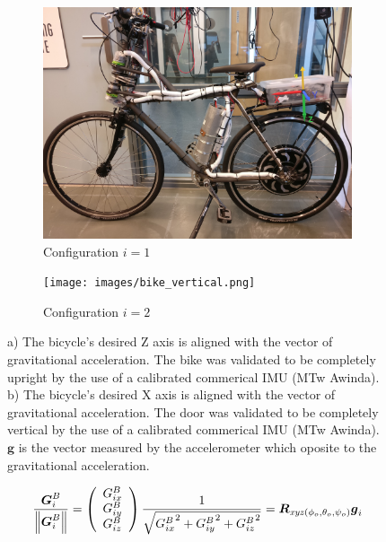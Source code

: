  \begin{figure}
    \centering
    \begin{subfigure}[htbb]{0.48\textwidth}
        \centering
        \includegraphics[width=\textwidth]{images/bike_upright.jpg}
        \caption{Configuration \ensuremath{i=1}}
        \label{fig:config1}
    \end{subfigure}
    \hfill
    \begin{subfigure}[htbb]{0.48\textwidth}
        \centering
        \texttt{[image: images/bike\_vertical.png]}
        \caption{Configuration \ensuremath{i=2}}
        \label{fig:config2}
    \end{subfigure}
    \caption{a) The bicycle's desired Z axis is aligned with the vector of gravitational acceleration. The bike was validated to be completely upright by the use of a calibrated commerical IMU (MTw Awinda). b) The bicycle's desired X axis is aligned with the vector of gravitational acceleration. The door was validated to be completely vertical by the use of a calibrated commerical IMU (MTw Awinda). \ensuremath{\mathbf{g}} is the vector measured by the accelerometer which oposite to the gravitational acceleration.}
 \end{figure}
 \begin{equation}
 \frac{\boldsymbol{G}_{i}^B}{\left\lVert\boldsymbol{G}_{i}^B\right\rVert}=\left(\begin{array}{l}{G_{i x}^B} \\ {G_{i y}^B} \\ {G_{i z}^B}\end{array}\right)\frac{1}{\sqrt{{G_{i x}^B}^2+{G_{i y}^B}^2+{G_{i z}^B}^2}}=\boldsymbol{R}_{\mathit{xyz}(\phi_o,\theta_o,\psi_o)}\boldsymbol{g}_i
\label{eq:firstIMU}
 \end{equation}
 
